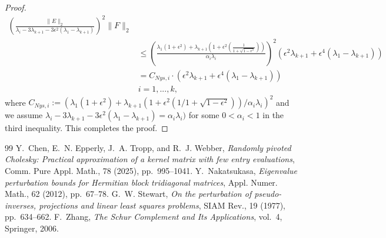 \documentclass[10pt,a4paper]{amsart}
\begin{document}
\begin{proof}
\[\begin{aligned}
        \left(\frac{\|E\|_2}{\lambda_i - 3\lambda_{k+1} - 3 \epsilon^2 (\lambda_1 - \lambda_{k+1})}\right)^2 \|F\|_2 \\
        & \leq
        \left(\frac{\lambda_1 (1+ \epsilon^2) + \lambda_{k+1} \left(1 + \epsilon^2 \left(\frac{1}{1 + \sqrt{1-\epsilon^2}}\right)\right)}{\alpha_{i} \lambda_i}\right)^2 \left(\epsilon^2\lambda_{k+1} + \epsilon^4 (\lambda_1 - \lambda_{k+1}   )\right) \\
        & = C_{Nys,i} \cdot \left(\epsilon^2\lambda_{k+1} + \epsilon^4 (\lambda_1 - \lambda_{k+1})\right) \\
        & i = 1, ..., k,
    \end{aligned}  
\]
where $C_{Nys, i} := \left(\lambda_1 (1+ \epsilon^2) + \lambda_{k+1} \left(1 + \epsilon^2 \left(1 / 1 + \sqrt{1-\epsilon^2}\right)\right) / \alpha_{i} \lambda_i\right)^2$ and we assume $\lambda_i - 3\lambda_{k+1} - 3 \epsilon^2 (\lambda_1 - \lambda_{k+1}) = \alpha_i \lambda_i)$ for some $0 < \alpha_{i} < 1$ in the third inequality. This completes the proof.
\end{proof}

\begin{thebibliography}{99}
 {\sc Y.~Chen, E.~N. Epperly, J.~A. Tropp, and R.~J. Webber}, {\em Randomly pivoted {Cholesky}: Practical approximation of a kernel matrix with few entry evaluations}, Comm. Pure Appl. Math., 78 (2025), pp.~995--1041.
 {\sc Y.~Nakatsukasa}, {\em Eigenvalue perturbation bounds for {Hermitian} block tridiagonal matrices}, Appl. Numer. Math., 62 (2012), pp.~67--78.
 {\sc G.~W. Stewart}, {\em On the perturbation of pseudo-inverses, projections and linear least squares problems}, SIAM Rev., 19 (1977), pp.~634--662.
 {\sc F.~Zhang}, {\em The {Schur} Complement and Its Applications}, vol.~4, Springer, 2006.
\end{thebibliography}
\end{document}
